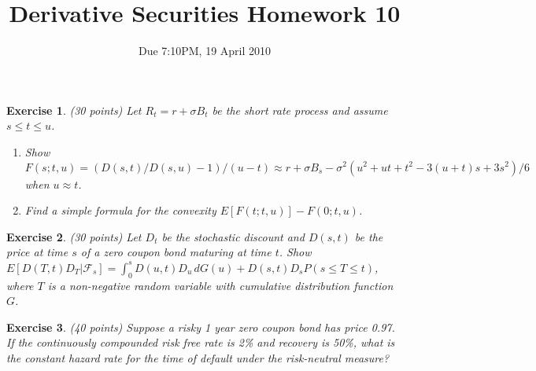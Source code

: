 \documentclass[11pt,fleqn]{amsproc}
\newcommand{\F}{\mathcal{F}}
\newtheorem{xca}{Exercise}
\begin{document}
\title{Derivative Securities Homework 10}
\author{Due 7:10PM, 19 April 2010}

\maketitle


\begin{xca}{(30 points)}
Let $R_t = r + \sigma B_t$ be the short rate process and
assume $s\le t \le u$.
\begin{enumerate}
\item Show $F(s; t, u) = (D(s,t)/D(s,u) - 1)/(u - t) \approx r + \sigma B_s
- \sigma^2(u^2 + ut + t^2 - 3(u + t)s + 3s^2)/6$ when $u \approx t$.
\item Find a simple formula for the convexity $E[F(t;t,u)] - F(0;t,u)$.
\end{enumerate}
\end{xca}

\begin{xca}{(30 points)}
Let $D_t$ be the stochastic discount and $D(s,t)$ be the price at time
$s$ of a zero coupon bond maturing at time $t$.  Show $E[D(T,t)D_T|\F_s]
= \int_0^s D(u,t)D_u\,dG(u) + D(s,t) D_s P(s\le T\le t)$, where $T$ is a
non-negative random variable with cumulative distribution function $G$.

\end{xca}

\begin{xca}{(40 points)}
Suppose a risky 1 year zero coupon bond has price 0.97. If the continuously
compounded risk free rate is 2\% and recovery is 50\%, what is the
constant hazard rate for the time of default under the risk-neutral 
measure?

\end{xca}
\end{document}
